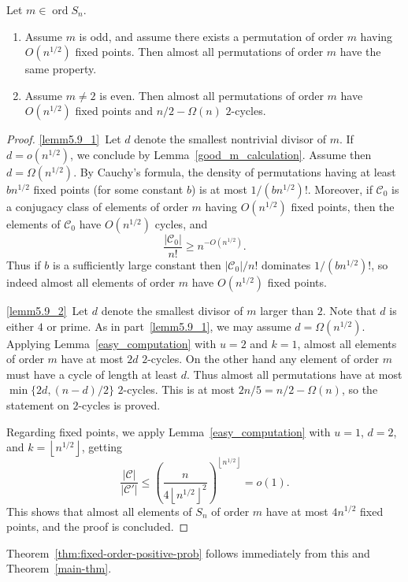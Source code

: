 \documentclass[ALCO,ThmDefs,Unicode,epreuves]{cedram}
\DeclareMathOperator{\ord}{ord}
\newcommand\calC{\mathcal{C}}
\newcommand\ordn{\ord S_n}
\newcommand\floor[1]{\left\lfloor{#1}\right\rfloor}
\begin{document}
\begin{lemma} Let $m \in \ordn$.
\begin{enumerate}
\item\label{lemm5.9_1} Assume $m$ is odd, and assume there exists a permutation of order $m$ having $O(n^{1/2})$ fixed points. Then almost all permutations of order $m$ have the same property.
\item\label{lemm5.9_2} Assume $m \neq 2$ is even. Then almost all permutations of order $m$ have $O(n^{1/2})$ fixed points and $n/2-\Omega(n)$ $2$-cycles.
\end{enumerate}
\end{lemma}
\begin{proof}
\eqref{lemm5.9_1}~Let $d$ denote the smallest nontrivial divisor of $m$. If $d = o(n^{1/2})$, we conclude by Lemma~\ref{good_m_calculation}. Assume then $d = \Omega(n^{1/2})$. By Cauchy's formula, the density of permutations having at least $bn^{1/2}$ fixed points (for some constant $b$) is at most $1/(bn^{1/2})!$. Moreover, if $\calC_0$ is a conjugacy class of elements of order $m$ having $O(n^{1/2})$ fixed points, then the elements of $\calC_0$ have $O(n^{1/2})$ cycles, and
\[
 \frac{|\calC_0|}{n!} \geq n^{-O(n^{1/2})}.
\]
Thus if $b$ is a sufficiently large constant then $|\calC_0|/n!$ dominates $1/(bn^{1/2})!$, so indeed almost all elements of order $m$ have $O(n^{1/2})$ fixed points.

\eqref{lemm5.9_2}~Let $d$ denote the smallest divisor of $m$ larger than $2$. Note that $d$ is either $4$ or prime. As in part~\eqref{lemm5.9_1}, we may assume $d = \Omega(n^{1/2})$. Applying Lemma~\ref{easy_computation} with $u=2$ and $k=1$, almost all elements of order $m$ have at most $2d$ $2$-cycles. On the other hand any element of order $m$ must have a cycle of length at least $d$. Thus almost all permutations have at most $\min \{2d, (n-d)/2\}$ $2$-cycles. This is at most $2n/5 = n/2-\Omega(n)$, so the statement on $2$-cycles is proved.

Regarding fixed points, we apply Lemma~\ref{easy_computation} with $u=1$, $d=2$, and $k=\floor{n^{1/2}}$, getting
\[
 \frac{|\calC|}{|\calC '|} \leq \left(\frac{n}{4\floor{n^{1/2}}^2}\right)^{\floor{n^{1/2}}} = o(1).
\]
This shows that almost all elements of $S_n$ of order $m$ have at most $4n^{1/2}$ fixed points, and the proof is concluded.
\end{proof}

Theorem~\ref{thm:fixed-order-positive-prob} follows immediately from this and Theorem~\ref{main-thm}.



\end{document}
